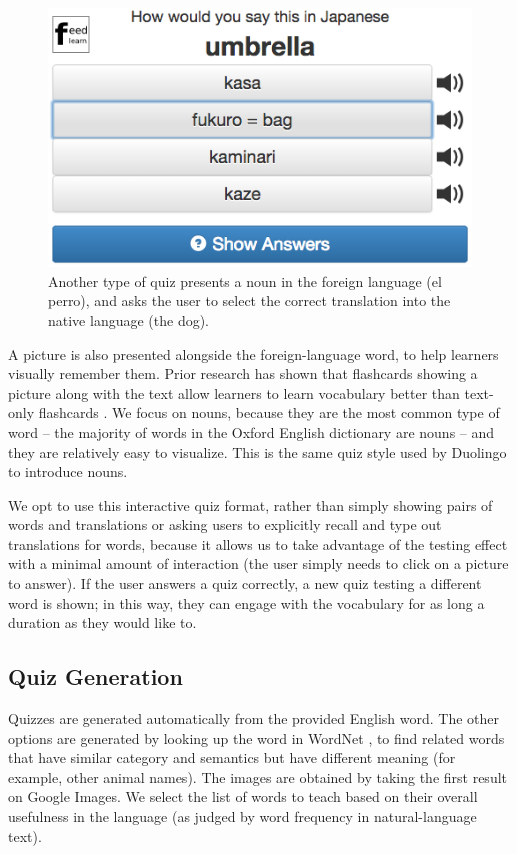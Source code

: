 \documentclass{sigchi}
\begin{document}
\begin{figure}
\centering
\includegraphics[width=2.0\columnwidth]{quiz2}
\caption{Another type of quiz presents a noun in the foreign language (el perro), and asks the user to select the correct translation into the native language (the dog).}
\label{fig:quiz2}
\end{figure}

A picture is also presented alongside the foreign-language word, to help learners visually remember them. Prior research has shown that flashcards showing a picture along with the text allow learners to learn vocabulary better than text-only flashcards \cite{multimediavocabulary}. We focus on nouns, because they are the most common type of word -- the majority of words in the Oxford English dictionary are nouns \cite{microlearning} -- and they are relatively easy to visualize. This is the same quiz style used by Duolingo to introduce nouns.

We opt to use this interactive quiz format, rather than simply showing pairs of words and translations or asking users to explicitly recall and type out translations for words, because it allows us to take advantage of the testing effect with a minimal amount of interaction (the user simply needs to click on a picture to answer). If the user answers a quiz correctly, a new quiz testing a different word is shown; in this way, they can engage with the vocabulary for as long a duration as they would like to.

\subsection{Quiz Generation}

Quizzes are generated automatically from the provided English word. The other options are generated by looking up the word in WordNet \cite{wordnet}, to find related words that have similar category and semantics but have different meaning (for example, other animal names). The images are obtained by taking the first result on Google Images. We select the list of words to teach based on their overall usefulness in the language (as judged by word frequency in natural-language text).
\end{document}
